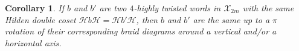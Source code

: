 \documentclass[12pt,reqno]{amsart}
\theoremstyle{plain}
\newtheorem{corollary}[theorem]{Corollary}
\theoremstyle{definition}
\begin{document}
\begin{corollary}\label{cor:HildenDoubleCosets}
If $b$ and $b'$ are two $4$-highly twisted words in $\mathcal{X}_{2m}$ with the same 
Hilden double coset $\mathcal{H}b\mathcal{H} = \mathcal{H}b'\mathcal{H}$, then $b$ 
and $b'$ are the same up to a $\pi$ rotation of their corresponding braid diagrams
around a vertical and/or a horizontal axis.  \qedsymbol
\end{corollary}



\end{document}
